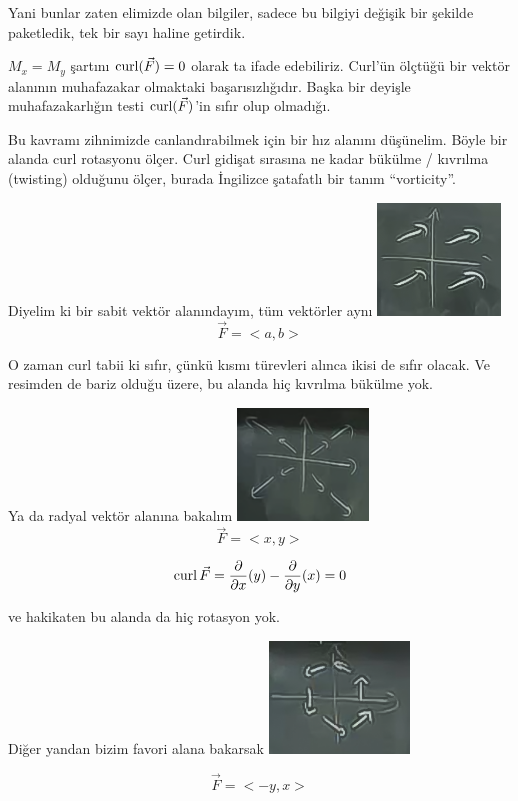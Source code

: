 \documentclass[12pt,fleqn]{article}\usepackage{../../common}
\begin{document}
Yani bunlar zaten elimizde olan bilgiler, sadece bu bilgiyi değişik bir şekilde
paketledik, tek bir sayı haline getirdik.

$M_x = M_y$ şartını $\operatorname{curl}(\vec{F}) = 0$ olarak ta ifade edebiliriz. Curl'ün
ölçtüğü bir vektör alanının muhafazakar olmaktaki başarısızlığıdır. Başka bir
deyişle muhafazakarlığın testi $\operatorname{curl}(\vec{F})$'in sıfır olup olmadığı.


Bu kavramı zihnimizde canlandırabilmek için bir hız alanını düşünelim. Böyle bir
alanda curl rotasyonu ölçer. Curl gidişat sırasına ne kadar bükülme / kıvrılma
(twisting) olduğunu ölçer, burada İngilizce şatafatlı bir tanım ``vorticity''.


Diyelim ki bir sabit vektör alanındayım, tüm vektörler aynı
\includegraphics[height=3cm]{21_5.png}
$$ \vec{F} = < a,b > $$

O zaman curl tabii ki sıfır, çünkü kısmı türevleri alınca ikisi de sıfır
olacak. Ve resimden de bariz olduğu üzere, bu alanda hiç kıvrılma bükülme yok.

Ya da radyal vektör alanına bakalım
\includegraphics[height=3cm]{21_6.png}
$$ \vec{F}= < x,y > $$

$$
\operatorname{curl} \vec{F} =
\frac{\partial }{\partial x}(y) -
\frac{\partial }{\partial y}(x) = 0
$$

ve hakikaten bu alanda da hiç rotasyon yok. 

Diğer yandan bizim favori alana bakarsak
\includegraphics[height=3cm]{21_1.png}

$$ \vec{F} = < -y,x > $$
\end{document}
